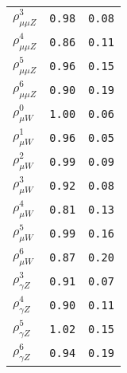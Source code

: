 \begin{table}
\begin{tabular}{lcc}
$\rho_{\mu\mu Z}^{3}$ & {\tt 0.98} & {\tt 0.08}\\
$\rho_{\mu\mu Z}^{4}$ & {\tt 0.86} & {\tt 0.11}\\
$\rho_{\mu\mu Z}^{5}$ & {\tt 0.96} & {\tt 0.15}\\
$\rho_{\mu\mu Z}^{6}$ & {\tt 0.90} & {\tt 0.19}\\
$\rho_{\mu W}^{0}$ & {\tt 1.00} & {\tt 0.06}\\
$\rho_{\mu W}^{1}$ & {\tt 0.96} & {\tt 0.05}\\
$\rho_{\mu W}^{2}$ & {\tt 0.99} & {\tt 0.09}\\
$\rho_{\mu W}^{3}$ & {\tt 0.92} & {\tt 0.08}\\
$\rho_{\mu W}^{4}$ & {\tt 0.81} & {\tt 0.13}\\
$\rho_{\mu W}^{5}$ & {\tt 0.99} & {\tt 0.16}\\
$\rho_{\mu W}^{6}$ & {\tt 0.87} & {\tt 0.20}\\
$\rho_{\gamma Z}^{3}$ & {\tt 0.91} & {\tt 0.07}\\
$\rho_{\gamma Z}^{4}$ & {\tt 0.90} & {\tt 0.11}\\
$\rho_{\gamma Z}^{5}$ & {\tt 1.02} & {\tt 0.15}\\
$\rho_{\gamma Z}^{6}$ & {\tt 0.94} & {\tt 0.19}\\
\hline
\end{tabular}
\end{table}

